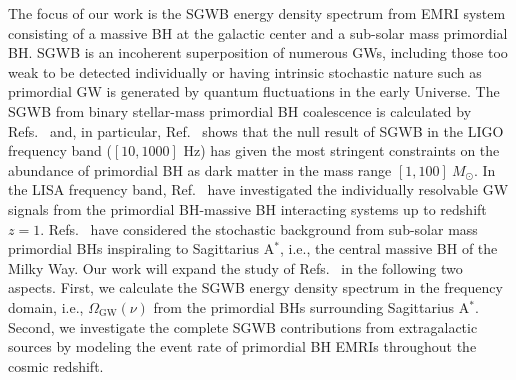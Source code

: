 The focus of our work is the \ac{SGWB} energy density spectrum from \ac{EMRI} system consisting of a massive \ac{BH} at the galactic center and a sub-solar mass primordial \ac{BH}.   
\ac{SGWB} is an incoherent superposition of numerous \acp{GW}, including those too weak to be detected individually \cite{Regimbau:2011rp,SGWBlivingreview,TheLIGOScientific:2016wyq,TheLIGOScientific:2016dpb,Abbott:2017xzg} or having intrinsic stochastic nature such as primordial \ac{GW} is generated by quantum fluctuations in the early Universe. 
The \ac{SGWB} from binary stellar-mass primordial \ac{BH} coalescence is calculated by Refs.~\cite{Mandic:2016lcn,Wang:2016ana,Chen:2018rzo,Clesse:2016ajp} and, in particular, Ref.~\cite{Wang:2016ana} shows that the null result of \ac{SGWB} in the LIGO frequency band ($[10,1000]$ Hz) has given the most stringent constraints on the abundance of primordial \ac{BH} as dark matter in the mass range $[1,100] ~M_\odot$.
In the \ac{LISA} frequency band, 
Ref.~\cite{Guo:2017njn} have investigated the individually resolvable \ac{GW} signals from the primordial \ac{BH}-massive \ac{BH} interacting systems up to redshift $z =1$. 
Refs.~\cite{Kuhnel:2017bvu, SgrA} have considered the stochastic background from sub-solar mass primordial \acp{BH} inspiraling to Sagittarius A$^\ast$, i.e., the central massive \ac{BH} of the Milky Way. 
Our work will expand the study of Refs.~\cite{Kuhnel:2017bvu, SgrA} in the following two aspects. First, we  calculate the \ac{SGWB} energy density spectrum in the frequency domain, i.e., $\Omega_\text{GW}(\nu)$ from the primordial \acp{BH} surrounding Sagittarius A$^\ast$. Second, we investigate the complete \ac{SGWB} contributions from extragalactic sources by modeling the event rate of primordial \ac{BH} \acp{EMRI} throughout the cosmic redshift.

